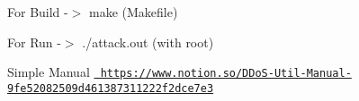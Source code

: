 For Build -\/$>$ make (Makefile)

For Run -\/$>$ ./attack.out (with root)

Simple Manual \href{https://www.notion.so/DDoS-Util-Manual-9fe52082509d461387311222f2dce7e3}{\texttt{ https\+://www.\+notion.\+so/\+DDo\+S-\/\+Util-\/\+Manual-\/9fe52082509d461387311222f2dce7e3}} 